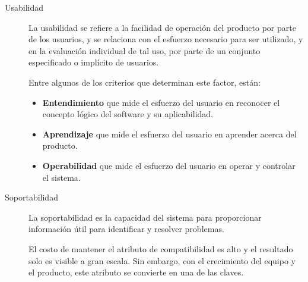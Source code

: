\begin{description}
\item [Usabilidad] La usabilidad se refiere a la facilidad de operación del
    producto por parte de los usuarios, y se relaciona con el esfuerzo
    necesario para ser utilizado, y en la evaluación individual de tal uso, por
    parte de un conjunto especificado o implícito de usuarios.

    Entre algunos de los criterios que determinan este factor, están:

    \begin{itemize}
    \item \textbf{Entendimiento} que mide el esfuerzo del usuario en reconocer el
        concepto lógico del software y su aplicabilidad.
    \item \textbf{Aprendizaje} que mide el esfuerzo del usuario en aprender
        acerca del producto.
    \item \textbf{Operabilidad} que mide el esfuerzo del usuario en operar y
        controlar el sistema.
    \end{itemize}

%

\item [Soportabilidad] La soportabilidad es la capacidad del sistema para
    proporcionar información útil para identificar y resolver problemas.

    El costo de mantener el atributo de compatibilidad es alto y el resultado
    solo es visible a gran escala. Sin embargo, con el crecimiento del equipo y
    el producto, este atributo se convierte en una de las claves\cite{Ashanin}.

%
\end{description}

